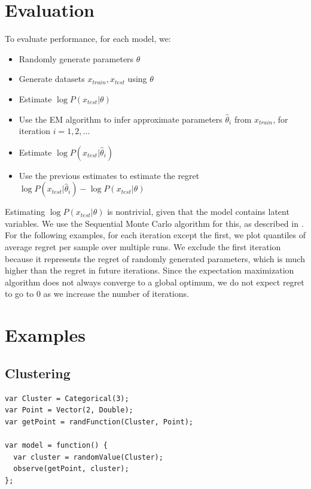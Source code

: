 \documentclass{article}
\begin{document}
  \section{Evaluation}

    To evaluate performance, for each model, we:
    \begin{itemize}
      \item
        Randomly generate parameters $\theta$
      \item
        Generate datasets $x_{train}, x_{test}$ using $\theta$
      \item
        Estimate $\log P(x_{test} | \theta)$
      \item
        Use the EM algorithm to infer approximate parameters $\hat{\theta}_i$ from $x_{train}$, for iteration $i = 1, 2, ...$
      \item
        Estimate $\log P(x_{test} | \hat{\theta}_i)$
      \item
        Use the previous estimates to estimate the regret $\log P(x_{test} | \hat{\theta}_i) - \log P(x_{test} | \theta)$
    \end{itemize}
    Estimating $\log P(x_{test} | \theta)$ is nontrivial, given that the model contains latent variables.
    We use the Sequential Monte Carlo algorithm for this, as described in \cite{dippl}.  For the following examples,
    for each iteration except the first, we plot quantiles of average regret per sample over multiple runs.  We exclude
    the first iteration because it represents the regret of randomly generated parameters, which is much higher than the regret in future iterations.  Since
    the expectation maximization algorithm does not always converge to a global optimum, we do not expect regret
    to go to 0 as we increase the number of iterations.


  \section{Examples}

\FloatBarrier
  \subsection{Clustering}

{\small
\begin{lstlisting}
var Cluster = Categorical(3);
var Point = Vector(2, Double);
var getPoint = randFunction(Cluster, Point);

var model = function() {
  var cluster = randomValue(Cluster);
  observe(getPoint, cluster);
};
\end{lstlisting}
}
\end{document}
